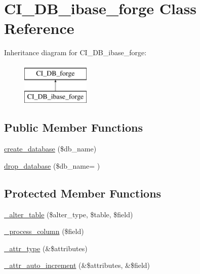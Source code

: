 \hypertarget{class_c_i___d_b__ibase__forge}{}\section{C\+I\+\_\+\+D\+B\+\_\+ibase\+\_\+forge Class Reference}
\label{class_c_i___d_b__ibase__forge}
Inheritance diagram for C\+I\+\_\+\+D\+B\+\_\+ibase\+\_\+forge\+:\begin{figure}[H]
\begin{center}
\leavevmode
\includegraphics[height=2.000000cm]{class_c_i___d_b__ibase__forge}
\end{center}
\end{figure}
\subsection*{Public Member Functions}
\begin{DoxyCompactItemize}
\item 
\hyperlink{class_c_i___d_b__ibase__forge_a902a7267babceb2ce595706f217e00ad}{create\+\_\+database} (\$db\+\_\+name)
\item 
\hyperlink{class_c_i___d_b__ibase__forge_a9e0a4706cac7e0bb62e76f23081000d4}{drop\+\_\+database} (\$db\+\_\+name= \textquotesingle{}\textquotesingle{})
\end{DoxyCompactItemize}
\subsection*{Protected Member Functions}
\begin{DoxyCompactItemize}
\item 
\hyperlink{class_c_i___d_b__ibase__forge_a41c6cae02f2fda8b429ad0afb9509426}{\+\_\+alter\+\_\+table} (\$alter\+\_\+type, \$table, \$field)
\item 
\hyperlink{class_c_i___d_b__ibase__forge_a8f38f1c5b5dddecca4befbe393f3f299}{\+\_\+process\+\_\+column} (\$field)
\item 
\hyperlink{class_c_i___d_b__ibase__forge_a8553be952084c6f7cdfff370a1d14f6b}{\+\_\+attr\+\_\+type} (\&\$attributes)
\item 
\hyperlink{class_c_i___d_b__ibase__forge_a2a013a5932439c3c44f0dad3436525f7}{\+\_\+attr\+\_\+auto\+\_\+increment} (\&\$attributes, \&\$field)
\end{DoxyCompactItemize}
